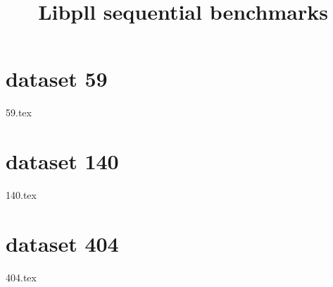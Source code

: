 \documentclass[a4paper]{article}
\begin{document}
\newcommand*{\figuretitle}[1]{%
    {\centering%
    \textbf{#1}%
    \par\medskip}%
}


\title{Libpll sequential benchmarks}
\maketitle




\section{dataset 59}
{59.tex}
%
%
\section{dataset 140}
{140.tex}
%
%
\section{dataset 404}
{404.tex}
\end{document}

